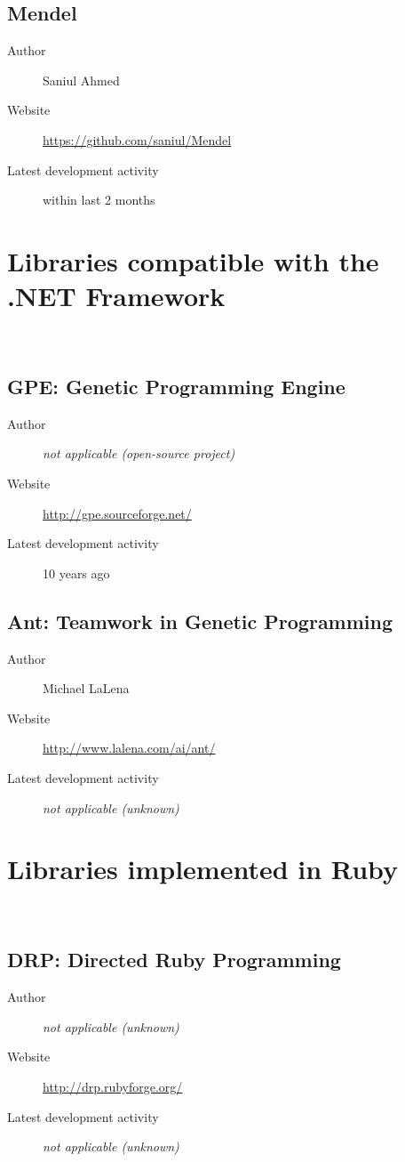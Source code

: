 \subsection*{Mendel}
\begin{description}
    \item[Author] Saniul Ahmed
    \item[Website] \url{https://github.com/saniul/Mendel}
    \item[Latest development activity] within last 2 months
\end{description}


\section{Libraries compatible with the .NET Framework}~\label{section:libraries-dotnet}
\subsection*{GPE: Genetic Programming Engine}
\begin{description}
    \item[Author] \textit{not applicable (open-source project)}
    \item[Website] \url{http://gpe.sourceforge.net/}
    \item[Latest development activity] 10 years ago
\end{description}


\subsection*{Ant: Teamwork in Genetic Programming}
\begin{description}
    \item[Author] Michael LaLena
    \item[Website] \url{http://www.lalena.com/ai/ant/}
    \item[Latest development activity] \textit{not applicable (unknown)}
\end{description}


\section{Libraries implemented in Ruby}~\label{section:libraries-ruby}
\subsection*{DRP: Directed Ruby Programming}
\begin{description}
    \item[Author] \textit{not applicable (unknown)}
    \item[Website] \url{http://drp.rubyforge.org/}
    \item[Latest development activity] \textit{not applicable (unknown)}
\end{description}



